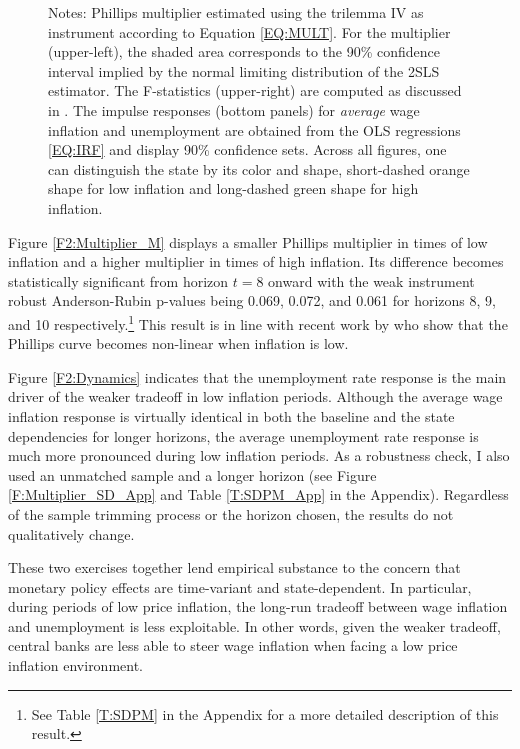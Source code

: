 \documentclass[12pt]{article}
\newcommand{\annote}[1]{\parbox{\textwidth}{\renewcommand{\baselinestretch}{1.0}\vspace{12pt} \footnotesize Notes: #1}}
\begin{document}
\begin{figure}[h!]
\begin{subfigure}[b]{0.9\textwidth}
		\end{subfigure}
		\annote{Phillips multiplier estimated using the trilemma IV as instrument according to Equation \eqref{EQ:MULT}. For the multiplier (upper-left), the shaded area corresponds to the 90\% confidence interval implied by the normal limiting distribution of the 2SLS estimator. The F-statistics (upper-right) are computed as discussed in \cite{Olea2013}. The impulse responses (bottom panels) for \textit{average} wage inflation and unemployment are obtained from the OLS regressions \eqref{EQ:IRF} and display 90\% confidence sets. Across all figures, one can distinguish the state by its color and shape, short-dashed orange shape for low inflation and long-dashed green shape for high inflation.}
	
\end{figure}

Figure \ref{F2:Multiplier_M} displays a smaller Phillips multiplier in times of low inflation and a higher multiplier in times of high inflation. Its difference becomes statistically significant from horizon $t=8$ onward with the weak instrument robust Anderson-Rubin p-values being 0.069, 0.072, and 0.061 for horizons 8, 9, and 10 respectively.\footnote{See Table \ref{T:SDPM} in the Appendix for a more detailed description of this result.} This result is in line with recent work by \cite{Forbes2021} who show that the Phillips curve becomes non-linear when inflation is low.

Figure \ref{F2:Dynamics} indicates that the unemployment rate response is the main driver of the weaker tradeoff in low inflation periods. Although the average wage inflation response is virtually identical in both the baseline and the state dependencies for longer horizons, the average unemployment rate response is much more pronounced during low inflation periods. As a robustness check, I also used an unmatched sample and a longer horizon (see Figure \ref{F:Multiplier_SD_App} and Table \ref{T:SDPM_App} in the Appendix). Regardless of the sample trimming process or the horizon chosen, the results do not qualitatively change.

These two exercises together lend empirical substance to the concern that monetary policy effects are time-variant and state-dependent. In particular, during periods of low price inflation, the long-run tradeoff between wage inflation and unemployment is less exploitable. In other words, given the weaker tradeoff, central banks are less able to steer wage inflation when facing a low price inflation environment.
\end{document}

